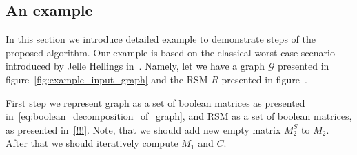 \subsection{An example}

In this section we introduce detailed example to demonstrate steps of the proposed algorithm.
Our example is based on the classical worst case scenario introduced by Jelle Hellings in~\cite{!!!}. 
Namely, let we have a graph $\mathcal{G}$ presented in figure~\ref{fig:example_input_graph} and the RSM $R$ presented in figure~\cite{!!!}.

First step we represent graph as a set of boolean matrices as presented in~\ref{eq:boolean_decomposition_of_graph}, and RSM as a set of boolean matrices, as presented in~\ref{!!!}. 
Note, that we should add new empty matrix $M_2^{S}$ to $M_2$. 
After that we should iteratively compute $M_1$ and $C$. 

